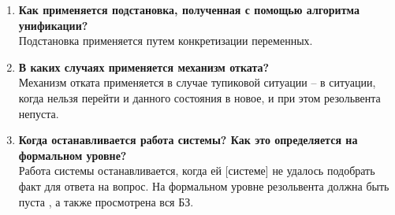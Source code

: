 \begin{enumerate}
	\newpage
	\item \textbf{Как применяется подстановка, полученная с помощью алгоритма унификации?} \\
	Подстановка применяется путем конкретизации переменных.

	\item \textbf{В каких случаях применяется механизм отката?} \\
	Механизм отката применяется в случае тупиковой ситуации -- в ситуации, когда нельзя перейти и данного состояния в новое, и при этом резольвента непуста.
	
	\item \textbf{Когда останавливается работа системы? Как это определяется на формальном уровне?} \\
	Работа системы останавливается, когда ей [системе] не удалось подобрать факт для ответа на вопрос. На формальном уровне резольвента должна быть пуста , а также просмотрена вся БЗ.
\end{enumerate}